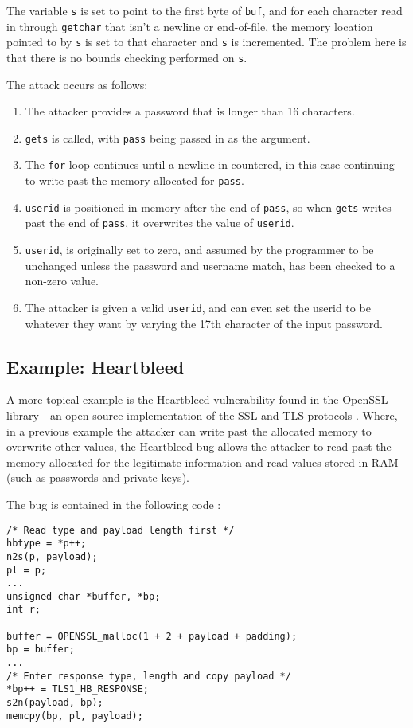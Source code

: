 The variable \verb!s! is set to point to the first byte of \verb!buf!, and for each character read in through \verb!getchar! that isn't a newline or end-of-file, the memory location pointed to by \verb!s! is set to that character and \verb!s! is incremented.
The problem here is that there is no bounds checking performed on \verb!s!.

The attack occurs as follows:

\begin{enumerate}
\item The attacker provides a password that is longer than 16 characters.
\item \verb!gets! is called, with \verb!pass! being passed in as the argument.
\item The \verb!for! loop continues until a newline in countered, in this case continuing to write past the memory allocated for \verb!pass!.
\item \verb!userid! is positioned in memory after the end of \verb!pass!, so when \verb!gets! writes past the end of \verb!pass!, it overwrites the value of \verb!userid!.
\item \verb!userid!, is originally set to zero, and assumed by the programmer to be unchanged unless the password and username match, has been checked to a non-zero value.
\item The attacker is given a valid \verb!userid!, and can even set the userid to be whatever they want by varying the 17th character of the input password.
\end{enumerate}

\subsection{Example: Heartbleed}

A more topical example is the Heartbleed vulnerability found in the OpenSSL library - an open source implementation of the SSL and TLS protocols \cite{heartbleedBlog}.
Where, in a previous example the attacker can write past the allocated memory to overwrite other values, the Heartbleed bug allows the attacker to read past the memory allocated for the legitimate information and read values stored in RAM (such as passwords and private keys).

The bug is contained in the following code \cite{sslSrc}:

\begin{verbatim}
/* Read type and payload length first */
hbtype = *p++;
n2s(p, payload);
pl = p;
...
unsigned char *buffer, *bp;
int r;

buffer = OPENSSL_malloc(1 + 2 + payload + padding);
bp = buffer;
...
/* Enter response type, length and copy payload */
*bp++ = TLS1_HB_RESPONSE;
s2n(payload, bp);
memcpy(bp, pl, payload);
\end{verbatim}


